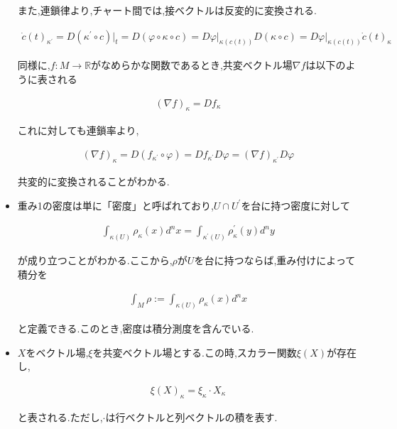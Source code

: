 \documentclass{jsarticle}
\begin{document}
\begin{itemize}
また,連鎖律より,チャート間では,接ベクトルは反変的に変換される.

\begin{align}
\dot{c}(t)_{\kappa^\prime} =D(\kappa^\prime \circ c)\rvert_t=D(\varphi \circ \kappa \circ c)=D\varphi\rvert_{\kappa(c(t))}D(\kappa\circ c)= D\varphi\rvert_{\kappa(c(t))}\dot{c}(t)_\kappa
\end{align}

同様に,$f:M\to\mathbb{R}$がなめらかな関数であるとき,共変ベクトル場$\nabla f$は以下のように表される

\begin{align}
(\nabla f)_\kappa =Df_\kappa
\end{align}

これに対しても連鎖率より,

\begin{align}
(\nabla f)_\kappa =D(f_{\kappa^\prime}\circ \varphi)=Df_{\kappa^\prime} D\varphi =(\nabla f)_{\kappa^\prime}D\varphi
\end{align}

共変的に変換されることがわかる.\\

\item 重み1の密度は単に「密度」と呼ばれており,$U \cap U^\prime$を台に持つ密度に対して

\begin{align}
\int_{\kappa(U)}\rho_\kappa(x)d^nx=\int_{\kappa^\prime(U)}\rho_\kappa^\prime(y)d^ny
\end{align}

が成り立つことがわかる.ここから,$\rho$が$U$を台に持つならば,重み付けによって積分を

\begin{align}
\int_M \rho:=\int_{\kappa(U)}\rho_\kappa (x)d^nx
\end{align}

と定義できる.このとき,密度は積分測度を含んでいる.\\

\item $X$をベクトル場,$\xi$を共変ベクトル場とする.この時,スカラー関数$\xi(X)$が存在し,

\begin{align}
\xi(X)_\kappa=\xi_\kappa \cdot X_\kappa
\end{align}

と表される.ただし,$\cdot$は行ベクトルと列ベクトルの積を表す.\\

\end{itemize}
\end{document}
